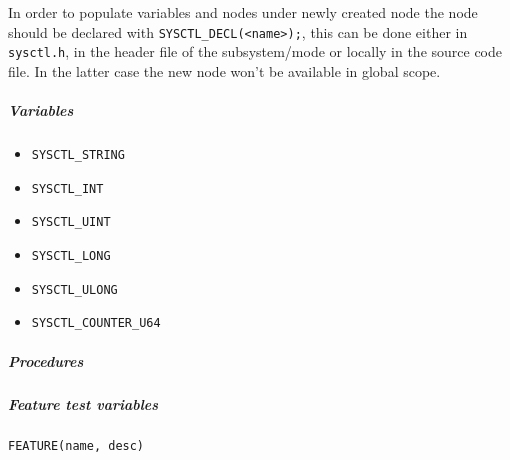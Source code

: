 

In order to populate variables and nodes under newly created node the node
should be declared with \verb+SYSCTL_DECL(<name>);+, this can be done either in
\verb+sysctl.h+, in the header file of the subsystem/mode or locally in the
source code file. In the latter case the new node won't be available in
global scope.

\subparagraph{Variables}
\begin{itemize}
\item \verb+SYSCTL_STRING+
\item \verb+SYSCTL_INT+
\item \verb+SYSCTL_UINT+
\item \verb+SYSCTL_LONG+
\item \verb+SYSCTL_ULONG+
\item \verb+SYSCTL_COUNTER_U64+
\end{itemize}

\subparagraph{Procedures}


\subparagraph{Feature test variables}
\verb+FEATURE(name, desc)+
